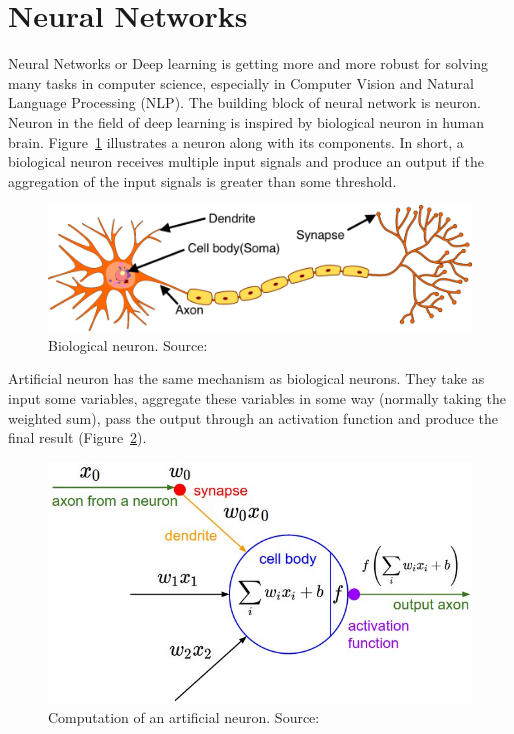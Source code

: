 \documentclass[12pt, sort&compress]{report}
\begin{document}
\section{Neural Networks}
\label{sec:2.1}
Neural Networks or Deep learning is getting more and more robust for solving many tasks in computer science, especially in Computer Vision and Natural Language Processing (NLP). The building block of neural network is neuron. Neuron in the field of deep learning is inspired by biological neuron in human brain. Figure~\ref{fig:2:01} illustrates a neuron along with its components. In short, a biological neuron receives multiple input signals and produce an output if the aggregation of the input signals is greater than some threshold. 
\begin{figure}[!htbp]
	\centering
	\includegraphics[scale=.25]{images/biological_neuron.png}
	\caption{Biological neuron. Source: \cite{saurabh2021}}
	\label{fig:2:01}
\end{figure}
\par Artificial neuron has the same mechanism as biological neurons. They take as input  some variables, aggregate these variables in some way (normally taking the weighted sum), pass the output through an activation function and produce the final result (Figure~\ref{fig:2:02}).
\begin{figure}[!htbp]
	\centering
	\includegraphics[scale=0.4]{images/activation.jpg}
	\caption{Computation of an artificial neuron. Source: \cite{online}}
	\label{fig:2:02}
\end{figure}
\end{document}
